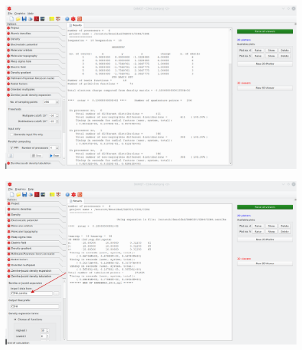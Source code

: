 \documentclass[a4paper,10pt]{article}
\begin{document}
\begin{minipage}{.5\linewidth}
\begin{figure}[H]
\caption{\label{fig:21}}
\begin{center}
\includegraphics[width=0.95\linewidth]{damqt_QS_fig21.png}
\end{center}
\end{figure} 
\end{minipage}
\begin{minipage}{.5\linewidth}
\begin{figure}[H]
\caption{\label{fig:22}}
\begin{center}
\includegraphics[width=0.95\linewidth]{damqt_QS_fig22.png}
\end{center}
\end{figure} 
\end{minipage}
\end{document}
